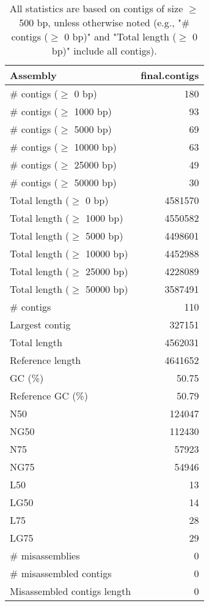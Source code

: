 \documentclass[12pt,a4paper]{article}
\begin{document}
\begin{table}[ht]
\begin{center}
\caption{All statistics are based on contigs of size $\geq$ 500 bp, unless otherwise noted (e.g., "\# contigs ($\geq$ 0 bp)" and "Total length ($\geq$ 0 bp)" include all contigs).}
\begin{tabular}{|l*{1}{|r}|}
\hline
Assembly & final.contigs \\ \hline
\# contigs ($\geq$ 0 bp) & 180 \\ \hline
\# contigs ($\geq$ 1000 bp) & 93 \\ \hline
\# contigs ($\geq$ 5000 bp) & 69 \\ \hline
\# contigs ($\geq$ 10000 bp) & 63 \\ \hline
\# contigs ($\geq$ 25000 bp) & 49 \\ \hline
\# contigs ($\geq$ 50000 bp) & 30 \\ \hline
Total length ($\geq$ 0 bp) & 4581570 \\ \hline
Total length ($\geq$ 1000 bp) & 4550582 \\ \hline
Total length ($\geq$ 5000 bp) & 4498601 \\ \hline
Total length ($\geq$ 10000 bp) & 4452988 \\ \hline
Total length ($\geq$ 25000 bp) & 4228089 \\ \hline
Total length ($\geq$ 50000 bp) & 3587491 \\ \hline
\# contigs & 110 \\ \hline
Largest contig & 327151 \\ \hline
Total length & 4562031 \\ \hline
Reference length & 4641652 \\ \hline
GC (\%) & 50.75 \\ \hline
Reference GC (\%) & 50.79 \\ \hline
N50 & 124047 \\ \hline
NG50 & 112430 \\ \hline
N75 & 57923 \\ \hline
NG75 & 54946 \\ \hline
L50 & 13 \\ \hline
LG50 & 14 \\ \hline
L75 & 28 \\ \hline
LG75 & 29 \\ \hline
\# misassemblies & 0 \\ \hline
\# misassembled contigs & 0 \\ \hline
Misassembled contigs length & 0 \\ \hline

\end{tabular}
\end{center}
\end{table}
\end{document}
